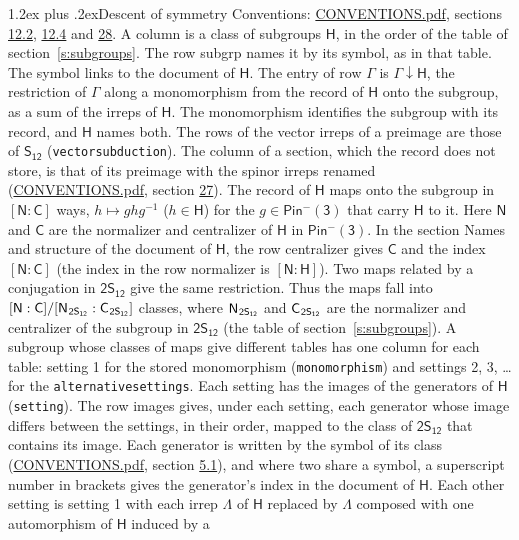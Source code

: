 \documentclass[10pt,a4paper]{article}
\makeatletter
\renewcommand\section{\@startsection{section}{1}{\z@}{-3ex plus -1ex minus -.2ex}%
  {1.2ex plus .2ex}{\normalfont\large\sffamily\bfseries\color{parttitle}}}
\numberwithin{equation}{section}
\newcommand{\grp}[1]{\mathsf{#1}}
\newcommand{\grpindex}[2]{[#1 : #2]}
\newcommand{\restr}[2]{#1\!\downarrow#2}
\newcommand{\hairsp}{\mkern1mu}
\makeatother
\begin{document}
\section{Descent of symmetry}\label{s:subduction}
Conventions: \href{../../CONVENTIONS.pdf}{CONVENTIONS.pdf}, sections \href{../../../rotation/CONVENTIONS.pdf\#conv.12.2}{12.2}, \href{../../../rotation/CONVENTIONS.pdf\#conv.12.4}{12.4} and \href{../../CONVENTIONS.pdf\#conv.28}{28}.
A column is a class of subgroups $\grp{H}$, in the order of the table of section~\ref{s:subgroups}. The row subgrp names it by its symbol, as in that table. The symbol links to the document of $\grp{H}$. The entry of row $\Gamma$ is $\restr{\Gamma}{\grp{H}}$, the restriction of $\Gamma$ along a monomorphism from the record of $\grp{H}$ onto the subgroup, as a sum of the irreps of $\grp{H}$. The monomorphism identifies the subgroup with its record, and $\grp{H}$ names both. The rows of the vector irreps of a preimage are those of \href{../../../rotation/data/pdf/S12.pdf}{$\grp{S_{12}}$} (\texttt{vectorsubduction}). The column of a section, which the record does not store, is that of its preimage with the spinor irreps renamed (\href{../../CONVENTIONS.pdf}{CONVENTIONS.pdf}, section \href{../../CONVENTIONS.pdf\#conv.27}{27}). \label{n:group.normalizer.o3}\label{n:group.centralizer.o3}\label{n:element.h}The record of $\grp{H}$ maps onto the subgroup in $\grpindex{\grp{N}}{\grp{C}}$ ways, $h \mapsto g h g^{-1}$ ($h \in \grp{H}$) for the $g \in \grp{Pin^{-}(3)}$ that carry $\grp{H}$ to it. Here $\grp{N}$ and $\grp{C}$ are the normalizer and centralizer of $\grp{H}$ in \href{Pinminus3.pdf}{$\grp{Pin^{-}(3)}$}. In the section Names and structure of the document of $\grp{H}$, the row centralizer gives $\grp{C}$ and the index $\grpindex{\grp{N}}{\grp{C}}$ (the index in the row normalizer is $\grpindex{\grp{N}}{\grp{H}}$). Two maps related by a conjugation in $\grp{2S_{12}}$ give the same restriction. Thus the maps fall into $\grpindex{\grp{N}}{\grp{C}}/\grpindex{\grp{N}_{\hairsp \grp{2S_{12}}}}{\grp{C}_{\hairsp \grp{2S_{12}}}}$ classes, where $\grp{N}_{\hairsp \grp{2S_{12}}}$ and $\grp{C}_{\hairsp \grp{2S_{12}}}$ are the normalizer and centralizer of the subgroup in $\grp{2S_{12}}$ (the table of section~\ref{s:subgroups}). \label{n:head.setting}A subgroup whose classes of maps give different tables has one column for each table: setting 1 for the stored monomorphism (\texttt{monomorphism}) and settings 2, 3, \dots{} for the \texttt{alternativesettings}. Each setting has the images of the generators of $\grp{H}$ (\texttt{setting}). \label{n:head.images}The row images gives, under each setting, each generator whose image differs between the settings, in their order, mapped to the class of $\grp{2S_{12}}$ that contains its image. Each generator is written by the symbol of its class (\href{../../CONVENTIONS.pdf}{CONVENTIONS.pdf}, section \href{../../../rotation/CONVENTIONS.pdf\#conv.5.1}{5.1}), and where two share a symbol, a superscript number in brackets gives the generator's index in the document of $\grp{H}$. \label{n:irrep.Delta}Each other setting is setting 1 with each irrep $\Lambda$ of $\grp{H}$ replaced by $\Lambda$ composed with one automorphism of $\grp{H}$ induced by a 
\end{document}
